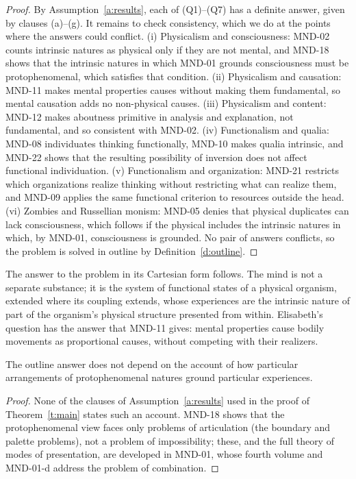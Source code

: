\documentclass{situationist-preprint}
\begin{document}
\begin{proof}
By Assumption~\ref{a:results}, each of (Q1)--(Q7) has a definite answer, given by clauses (a)--(g). It remains to check consistency, which we do at the points where the answers could conflict. (i) Physicalism and consciousness: MND-02 counts intrinsic natures as physical only if they are not mental, and MND-18 shows that the intrinsic natures in which MND-01 grounds consciousness must be protophenomenal, which satisfies that condition. (ii) Physicalism and causation: MND-11 makes mental properties causes without making them fundamental, so mental causation adds no non-physical causes. (iii) Physicalism and content: MND-12 makes aboutness primitive in analysis and explanation, not fundamental, and so consistent with MND-02. (iv) Functionalism and qualia: MND-08 individuates thinking functionally, MND-10 makes qualia intrinsic, and MND-22 shows that the resulting possibility of inversion does not affect functional individuation. (v) Functionalism and organization: MND-21 restricts which organizations realize thinking without restricting what can realize them, and MND-09 applies the same functional criterion to resources outside the head. (vi) Zombies and Russellian monism: MND-05 denies that physical duplicates can lack consciousness, which follows if the physical includes the intrinsic natures in which, by MND-01, consciousness is grounded. No pair of answers conflicts, so the problem is solved in outline by Definition~\ref{d:outline}.
\end{proof}

The answer to the problem in its Cartesian form follows. The mind is not a separate substance; it is the system of functional states of a physical organism, extended where its coupling extends, whose experiences are the intrinsic nature of part of the organism's physical structure presented from within. Elisabeth's question has the answer that MND-11 gives: mental properties cause bodily movements as proportional causes, without competing with their realizers.

\begin{corollary}\label{c:details}
The outline answer does not depend on the account of how particular arrangements of protophenomenal natures ground particular experiences.
\end{corollary}

\begin{proof}
None of the clauses of Assumption~\ref{a:results} used in the proof of Theorem~\ref{t:main} states such an account. MND-18 shows that the protophenomenal view faces only problems of articulation (the boundary and palette problems), not a problem of impossibility; these, and the full theory of modes of presentation, are developed in MND-01, whose fourth volume and MND-01-d address the problem of combination.
\end{proof}
\end{document}
